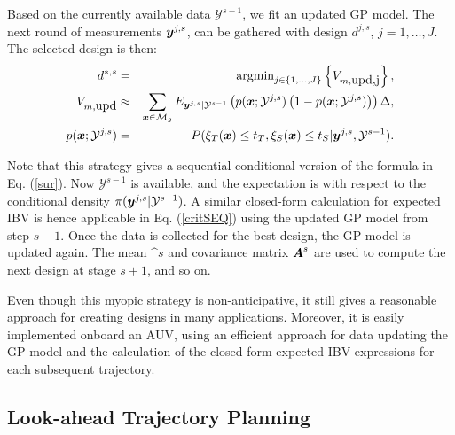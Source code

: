 \documentclass[aoas]{imsart}
\begin{document}
Based on the currently available data $\mathcal{Y}^{s-1}$, we
fit an updated GP model.  The next round of measurements
${\boldsymbol y}^{j,s}$, can be gathered with design $d^{j,s}$, $j=1,\ldots,J$. The
selected design is then:
\begin{eqnarray}\label{critSEQ}
    d^{*,s} &=& \mbox{argmin}_{j \in \{1,\ldots,J\}} \left\{ V_{m,\mbox{upd,j}} \right\},  \\
V_{m,\mbox{upd}} & \approx & \sum_{\bx \in \mathcal{M}_g} E_{\by^{j,s}|\mathcal{Y}^{s-1}} \left( p(\bx;\mathcal{Y}^{j,s})\left( 1-p(\bx;\mathcal{Y}^{j,s})\right) \right) \Delta, \nonumber \\
    p(\bx;\mathcal{Y}^{j,s}) &=& P(\xi_T(\bx) \leq t_T, \xi_S(\bx) \leq t_S |\by^{j,s},\mathcal{Y}^{s-1}). \nonumber
\end{eqnarray}

Note that this strategy gives a sequential conditional version of the
formula in Eq. (\ref{sur}). Now $\mathcal{Y}^{s-1}$ is available, and
the expectation is with respect to the conditional density
$\pi({\boldsymbol y}^{j,s}|\mathcal{Y}^{s-1})$. A similar closed-form calculation
for expected IBV is hence applicable in Eq. (\ref{critSEQ}) using the
updated GP model from step $s-1$.  Once the data is collected for the
best design, the GP model is updated again. The mean $\bm^{s}$ and
covariance matrix ${\boldsymbol A}^{s}$ are used to compute the next design at
stage $s+1$, and so on.

Even though this myopic strategy is non-anticipative, it still gives a
reasonable approach for creating designs in many
applications. Moreover, it is easily implemented onboard an AUV,
using an efficient approach for data updating the GP model and the
calculation of the closed-form expected IBV expressions for each
subsequent trajectory.


\subsection{Look-ahead Trajectory Planning}
\label{LA}
\end{document}

